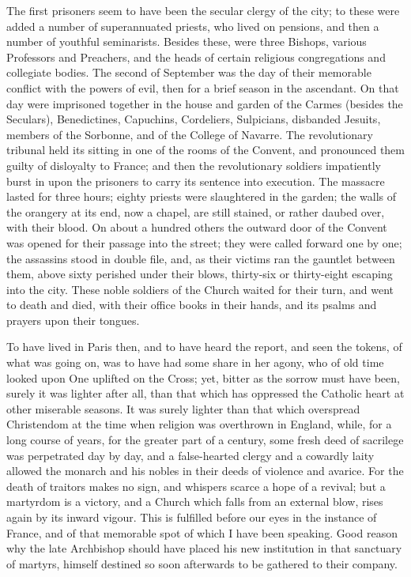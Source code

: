 The first prisoners seem to
have been the secular clergy of the city; to these were added a number
of superannuated priests, who lived on pensions, and then a number of
youthful seminarists. Besides these, were three Bishops, various
Professors and Preachers, and the heads of certain religious
congregations and collegiate bodies. The second of September was the
day of their memorable conflict with the powers of evil, then for a
brief season in the ascendant. On that day were imprisoned together in
the house and garden of the Carmes (besides the Seculars),
Benedictines, Capuchins, Cordeliers, Sulpicians, disbanded Jesuits,
members of the Sorbonne, and of the College of Navarre. The
revolutionary tribunal held its sitting in one of the rooms of the
Convent, and pronounced them guilty of disloyalty to France; and then
the revolutionary soldiers impatiently burst in upon the prisoners to
carry its sentence into execution. The massacre lasted for three
hours; eighty priests were slaughtered in the garden; the walls of the
orangery at its end, now a chapel, are still stained, or rather daubed
over, with their blood. On about a hundred others the outward door of
the Convent was opened for their passage into the street; they were
called forward one by one; the assassins stood in double file, and, as
their victims ran the gauntlet between them, above sixty perished
under their blows, thirty-six or thirty-eight escaping into the city.
These noble soldiers of the Church waited for their turn, and
went to death and died, with their office books in their hands, and
its psalms and prayers upon their tongues.

To have lived in Paris then,
and to have heard the report, and seen the tokens, of what was going
on, was to have had some share in her agony, who of old time looked
upon One uplifted on the Cross; yet, bitter as the sorrow must have
been, surely it was lighter after all, than that which has oppressed
the Catholic heart at other miserable seasons. It was surely lighter
than that which overspread Christendom at the time when religion was
overthrown in England, while, for a long course of years, for the
greater part of a century, some fresh deed of sacrilege was
perpetrated day by day, and a false-hearted clergy and a cowardly
laity allowed the monarch and his nobles in their deeds of violence
and avarice. For the death of traitors makes no sign, and whispers
scarce a hope of a revival; but a martyrdom is a victory, and a Church
which falls from an external blow, rises again by its inward vigour.
This is fulfilled before our eyes in the instance of France, and of
that memorable spot of which I have been speaking. Good reason why the
late Archbishop should have placed his new institution in that
sanctuary of martyrs, himself destined so soon afterwards to be
gathered to their company.

